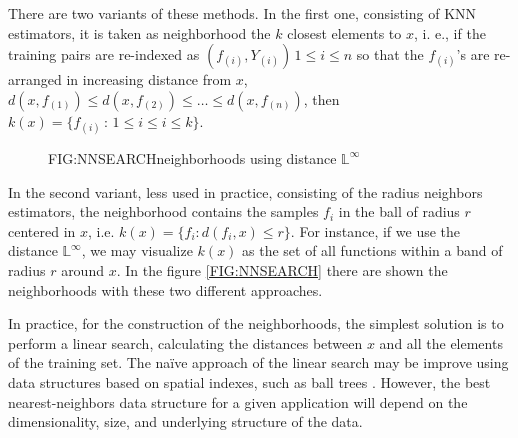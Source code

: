 
There are two variants of these methods. In the first one, consisting of
\ac{KNN} estimators, it is taken as neighborhood the $k$ closest
elements to $x$, i. e., if the training pairs are re-indexed as
$(f_{(i)}, Y_{(i)}) \, 1\le i\le n$ so that the
$f_{(i)}$'s are re-arranged in increasing distance from $x$,
$d(x, f_{(1)}) \le d(x, f_{(2)}) \le \dots \le d(x, f_{(n)})$,
 then $k(x) = \{f_{(i)} \, : \, 1 \le i \le i\le k\}$.

\begin{figure}[Neighborhoods using distance $\mathbb{L}^\infty$]{FIG:NNSEARCH}{neighborhoods using distance $\mathbb{L}^\infty$}
	 \quad
\end{figure}

In the second variant, less used in practice, consisting of the radius neighbors
estimators, the neighborhood contains the samples $f_i$ in the ball of
radius $r$ centered in $x$, i.e.
$k(x) = \{ f_i : d(f_i , x) \le r\}$. For instance, if we
use the distance $\mathbb{L}^\infty$, we may visualize $k(x)$ as the set of all
functions within a band  of radius $r$ around $x$.
In the figure \ref{FIG:NNSEARCH} there are shown the neighborhoods with these two different
approaches.

In practice, for the construction of the neighborhoods, the simplest solution is
 to perform a linear search, calculating the distances between $x$ and all the
 elements of the training set.
The naïve approach of the linear search may be improve using data structures
based on spatial indexes, such as ball trees \cite{Kumar2008}. However, the best
nearest-neighbors data structure for a given application will depend on the
dimensionality, size, and underlying structure of the data.
